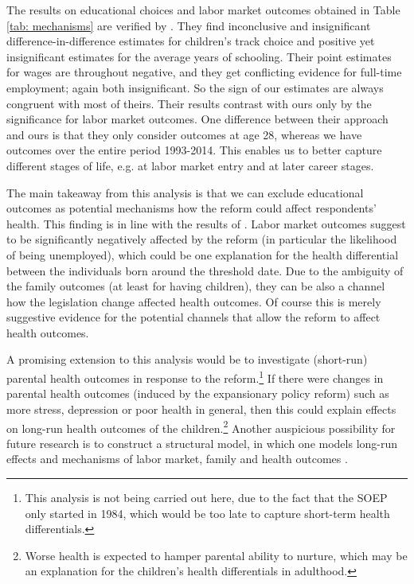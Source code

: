 \documentclass[a4paper ]{article}
\begin{document}
The results on educational choices and labor market outcomes obtained in Table \ref{tab: mechanisms} are verified by \cite{dustmann2012expansions}. They find inconclusive and insignificant difference-in-difference estimates for children's track choice and positive yet insignificant estimates for the average years of schooling. Their point estimates for wages are throughout negative, and they get conflicting evidence for full-time employment; again both insignificant. So the sign of our estimates are always congruent with most of theirs. Their results contrast with ours only by the significance for labor market outcomes. One difference between their approach and ours is that they only consider outcomes at age 28, whereas we have outcomes over the entire period 1993-2014. This enables us to better capture different stages of life, e.g. at labor market entry and at later career stages.\newline 

The main takeaway from this analysis is that we can exclude educational outcomes as potential mechanisms how the reform could affect respondents' health. This finding is in line with the results of \cite{dustmann2012expansions}. Labor market outcomes suggest to be significantly negatively affected by the reform (in particular the likelihood of being unemployed), which could be one explanation for the health differential between the individuals born around the threshold date. Due to the ambiguity of the family outcomes (at least for having children), they can be also a channel how the legislation change affected health outcomes. Of course this is merely suggestive evidence for the potential channels that allow the reform to affect health outcomes.\newline

A promising extension to this analysis would be to investigate (short-run) parental health outcomes in response to the reform.\footnote{This analysis is not being carried out here, due to the fact that the SOEP only started in 1984, which would be too late to capture short-term health differentials.} If there were changes in parental health outcomes (induced by the expansionary policy reform) such as more stress, depression or poor health in general, then this could explain effects on long-run health outcomes of the children.\footnote{Worse health is expected to hamper parental ability to nurture, which may be an explanation for the children's health differentials in adulthood.} \newline Another auspicious possibility for future research is to construct a structural model, in which one models long-run effects and mechanisms of labor market, family and health outcomes \citep{garrouste2015lasting}.
\end{document}
